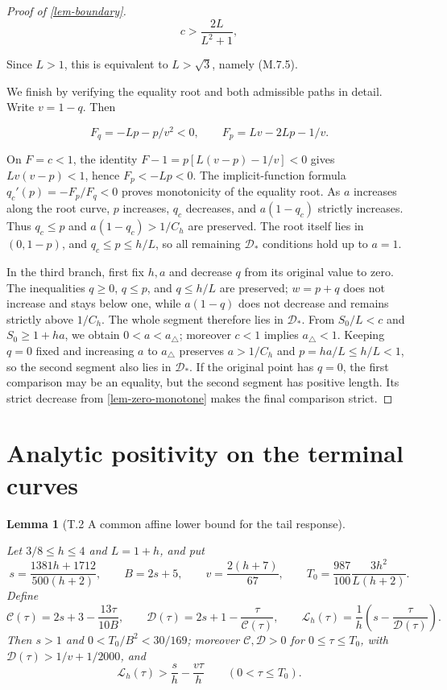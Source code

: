\documentclass[11pt,a4paper]{article}
\theoremstyle{proofmanuscript}
\newtheorem{lemma}[theorem]{Lemma}
\begin{document}
\begin{proof}[Proof of \ref{lem-boundary}]
\[
c>\frac{2L}{L^2+1},
\]

Since \(L>1\), this is equivalent to \(L>\sqrt3\), namely (M.7.5).

We finish by verifying the equality root and both admissible paths in detail. Write \(v=1-q\). Then

\[
F_q=-Lp-p/v^2<0,\qquad F_p=Lv-2Lp-1/v.
\]

On \(F=c<1\), the identity \(F-1=p[L(v-p)-1/v]<0\) gives \(Lv(v-p)<1\), hence \(F_p<-Lp<0\). The implicit-function formula \(q_c'(p)=-F_p/F_q<0\) proves monotonicity of the equality root. As \(a\) increases along the root curve, \(p\) increases, \(q_c\) decreases, and \(a(1-q_c)\) strictly increases. Thus \(q_c\le p\) and \(a(1-q_c)>1/C_h\) are preserved. The root itself lies in \((0,1-p)\), and \(q_c\le p\le h/L\), so all remaining \(\mathcal D_*\) conditions hold up to \(a=1\).

In the third branch, first fix \(h,a\) and decrease \(q\) from its original value to zero. The inequalities \(q\ge0\), \(q\le p\), and \(q\le h/L\) are preserved; \(w=p+q\) does not increase and stays below one, while \(a(1-q)\) does not decrease and remains strictly above \(1/C_h\). The whole segment therefore lies in \(\mathcal D_*\). From \(S_0/L<c\) and \(S_0\ge1+ha\), we obtain \(0<a<a_\triangle\); moreover \(c<1\) implies \(a_\triangle<1\). Keeping \(q=0\) fixed and increasing \(a\) to \(a_\triangle\) preserves \(a>1/C_h\) and \(p=ha/L\le h/L<1\), so the second segment also lies in \(\mathcal D_*\). If the original point has \(q=0\), the first comparison may be an equality, but the second segment has positive length. Its strict decrease from \ref{lem-zero-monotone} makes the final comparison strict.

\end{proof}


\section{Analytic positivity on the terminal curves}

\begin{lemma}[T.2 A common affine lower bound for the tail response]\label{lem-common-tail-line}

Let \(3/8\le h\le4\) and \(L=1+h\), and put \[
s=\frac{1381h+1712}{500(h+2)},\qquad B=2s+5,\qquad
v=\frac{2(h+7)}{67},\qquad
T_0=\frac{987}{100}\frac{3h^2}{L(h+2)}.
\] Define \[
\mathcal C(\tau)=2s+3-\frac{13\tau}{10B},\qquad
\mathcal D(\tau)=2s+1-\frac{\tau}{\mathcal C(\tau)},\qquad
\mathcal L_h(\tau)=\frac1h\left(s-\frac{\tau}{\mathcal D(\tau)}\right).
\] Then \(s>1\) and \(0<T_0/B^2<30/169\); moreover \(\mathcal C,\mathcal D>0\) for \(0\le\tau\le T_0\), with \(\mathcal D(\tau)>1/v+1/2000\), and \[
\mathcal L_h(\tau)>\frac{s}{h}-\frac{v\tau}{h}
\qquad(0<\tau\le T_0).
\]

\end{lemma}
\end{document}
